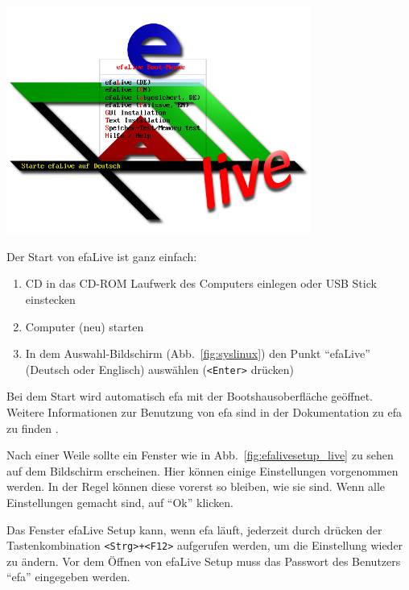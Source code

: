 \documentclass[a4paper,12pt,twoside]{article}
\begin{document}
\begin{minipage}{\linewidth}
    \centering
    \captionsetup{type=figure}
    \includegraphics[width=10cm]{screenshots/efaLivede-img2.png}
    \label{fig:syslinux}
\end{minipage}
\bigskip

Der Start von efaLive ist ganz einfach:

\begin{enumerate}
    \item CD in das CD-ROM Laufwerk des Computers einlegen oder USB Stick
        einstecken
    \item Computer (neu) starten
    \item In dem Auswahl-Bildschirm (Abb.~\ref{fig:syslinux}) den Punkt
        "`efaLive"' (Deutsch oder Englisch) auswählen (\texttt{{\textless}Enter{\textgreater}} 
        drücken)
\end{enumerate}

Bei dem Start wird automatisch efa mit der Bootshausoberfläche geöffnet.
Weitere Informationen zur Benutzung von efa sind in der Dokumentation
zu efa zu finden \cite{EFA2}.

Nach einer Weile sollte ein Fenster wie in Abb.~\ref{fig:efalivesetup_live} zu
sehen auf dem Bildschirm erscheinen. Hier können einige Einstellungen vorgenommen
werden. In der Regel können diese vorerst so bleiben, wie sie sind. 
Wenn alle Einstellungen gemacht sind, auf "`Ok"' klicken.

Das Fenster efaLive Setup kann, wenn efa läuft, jederzeit durch drücken
der Tastenkombination \texttt{{\textless}Strg{\textgreater}+{\textless}F12{\textgreater}} 
aufgerufen
werden, um die Einstellung wieder zu ändern. Vor dem Öffnen von efaLive
Setup muss das Passwort des Benutzers "`efa"' eingegeben werden.
\end{document}
